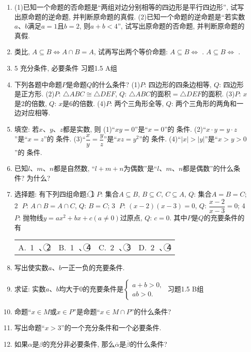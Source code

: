 \documentclass[10pt,a4paper]{article}
\newcommand{\bracket}[1]{(\hbox to #1pt{})}
\newcommand{\fourch}[4]{\par\begin{tabular}{p{.23\textwidth}p{.23\textwidth}p{.23\textwidth}p{.23\textwidth}}
A.~#1 &B.~#2& C.~#3& D.~#4
\end{tabular}}
\begin{document}
\begin{enumerate}[1.]
(2)由命题甲成立, 可推出命题乙不成立, 下列说法一定正确的是\bracket{20}.
\fourch{命题甲不成立, 可推出命题乙成立}{命题甲不成立, 可推出命题乙不成立}{命题乙成立, 可推出命题甲成立}{命题乙成立, 可推出命题甲不成立}
\item (1)已知一个命题的否命题是``两组对边分别相等的四边形是平行四边形'', 试写出原命题的逆命题, 并判断原命题的真假.
(2)已知一个命题的逆命题是``若实数$a$、$b$满足$a=1$且$b=2$, 则$a+b<4$'', 试写出原命题的否命题, 并判断原命题的真假.
\item 类比, $A\subseteq B\Leftrightarrow A\cap B=A$, 试再写出两个等价命题:
$A\subseteq B\Leftrightarrow$ .
$A\subseteq B\Leftrightarrow$ .
\item 5  充分条件, 必要条件
习题1.5  A组
\item 下列各题中命题$P$是命题$Q$的什么条件?
(1)$P$: 四边形的四条边相等, 		$Q$: 四边形是正方形.
(2)$P$: $\triangle ABC\cong \triangle DEF$, 			$Q$: $\triangle ABC$的面积$=\triangle DEF$的面积.
(3)$P$: $x$是2的倍数, 				$Q$: $x$是6的倍数.
(4)$P$: 两个三角形全等, 			$Q$: 两个三角形的两角和一边对应相等.
\item 填空:
若$x$、$y$、$z$都是实数, 则
(1)``$xy=0$''是``$x=0$''的  条件.
(2)``$x\cdot y=y\cdot z$''是``$x=z$''的 条件.
(3)``$\dfrac xy=\dfrac yz$''是``$xz=y^2$''的 条件.
(4)``$|x|>|y|$''是``$x>y>0$''的 条件.
\item 已知$l$、$m$、$n$都是自然数, ``$l+m+n$为偶数''是``$l$、$m$、$n$都是偶数''的什么条件? 为什么?
\item 选择题:
有下列四组命题:
\textcircled{1} $P$: 集合$A\subseteq B$, $B\subseteq C$, $C\subseteq A$, 		$Q$: 集合$A=B=C$;
\textcircled{2} $P$: $A\cap B=A\cap C$, 					$Q$: $B=C$;
\textcircled{3} $P$: $(x-2)(x-3)=0$, 				$Q$: $\dfrac{x-2}{x-3}=0$;
\textcircled{4} $P$: 抛物线$y=ax^2+bx+c(a\ne 0)$过原点, $Q$: $c=0$.
其中$P$是$Q$的充要条件的有
\fourch{\textcircled{1} 、\textcircled{2} }{\textcircled{1} 、\textcircled{4} }{\textcircled{2} 、\textcircled{3} }{\textcircled{2} 、\textcircled{4} }
\item 写出使实数$a$、$b$一正一负的充要条件.
\item 求证: 实数$a$、$b$均大于0的充要条件是$\begin{cases} a+b>0, \\ ab>0. \end{cases}$
习题1.5  B组
\item 命题``$x\in M$或$x\in P$''是命题``$x\in M\cap P$''的什么条件?
\item 写出命题``$x>3$''的一个充分条件和一个必要条件.
\item 如果$\alpha$是$\beta$的充分非必要条件, 那么$\overline{\alpha }$是$\overline{\beta }$的什么条件?

\end{enumerate}
\end{document}
